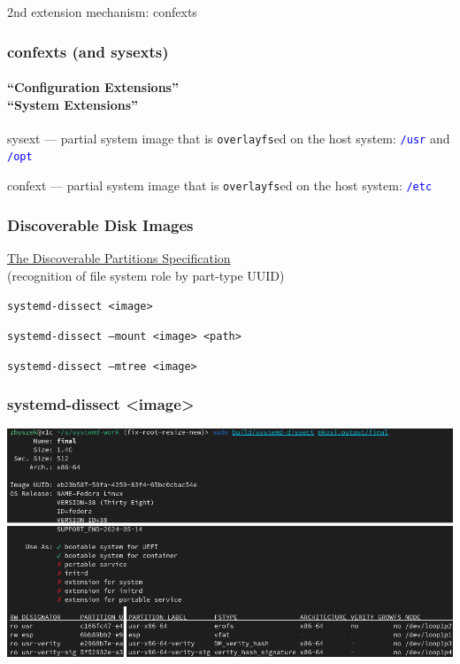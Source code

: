 \documentclass[]{beamer}
\newcommand\pp{}
\begin{document}
\begin{frame}
  2nd extension mechanism: confexts
\end{frame}

\begin{frame}
  \frametitle{confexts (and sysexts)}
  \framesubtitle{``Configuration Extensions''\\
                 ``System Extensions''}

  sysext — partial system image that is \texttt{overlayfs}ed on the host system:
  \textcolor{blue}{\texttt{/usr}} and \textcolor{blue}{\texttt{/opt}}
  \\\quad\pp

  confext — partial system image that is \texttt{overlayfs}ed on the host system:
  \textcolor{blue}{\texttt{/etc}}
  \\\quad\pp
\end{frame}

\begin{frame}
  \frametitle{Discoverable Disk Images}

  \href{https://uapi-group.org/specifications/specs/discoverable_partitions_specification/}{The Discoverable Partitions Specification}\\
  (recognition of file system role by part-type UUID)
  \\\quad\pp

  \texttt{systemd-dissect <image>}
  \\\quad\pp

  \texttt{systemd-dissect --mount <image> <path>}
  \\\quad\pp

  \texttt{systemd-dissect --mtree <image>}
\end{frame}

\begin{frame}
  \frametitle{systemd-dissect <image>}

  \hspace*{-2em}\includegraphics[width=1.15\textwidth]{images/systemd-dissect.png}
\end{frame}
\end{document}
